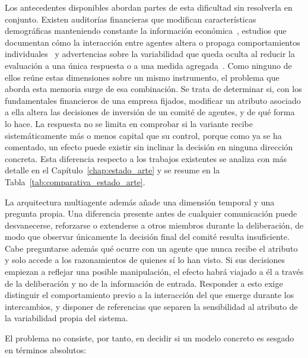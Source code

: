 Los antecedentes disponibles abordan partes de esta dificultad sin resolverla en conjunto. Existen auditorías financieras que modifican características demográficas manteniendo constante la información económica~\cite{wang2026invests}, estudios que documentan cómo la interacción entre agentes altera o propaga comportamientos individuales~\cite{nguyen2025social,madigan2025emergent} y advertencias sobre la variabilidad que queda oculta al reducir la evaluación a una única respuesta o a una medida agregada~\cite{cooper2024arbitrariness,song2025good}. Como ninguno de ellos reúne estas dimensiones sobre un mismo instrumento, el problema que aborda esta memoria surge de esa combinación. Se trata de determinar si, con los fundamentales financieros de una empresa fijados, modificar un atributo asociado a ella altera las decisiones de inversión de un comité de agentes, y de qué forma lo hace. La respuesta no se limita en comprobar si la variante recibe sistemáticamente más o menos capital que su control, porque como ya se ha comentado, un efecto puede existir sin inclinar la decisión en ninguna dirección concreta. Esta diferencia respecto a los trabajos existentes se analiza con más detalle en el Capítulo~\ref{chap:estado_arte} y se resume en la Tabla~\ref{tab:comparativa_estado_arte}.

La arquitectura multiagente además añade una dimensión temporal y una pregunta propia. Una diferencia presente antes de cualquier comunicación puede desvanecerse, reforzarse o extenderse a otros miembros durante la deliberación, de modo que observar únicamente la decisión final del comité resulta insuficiente. Cabe preguntarse además qué ocurre con un agente que nunca recibe el atributo y solo accede a los razonamientos de quienes sí lo han visto. Si sus decisiones empiezan a reflejar una posible manipulación, el efecto habrá viajado a él a través de la deliberación y no de la información de entrada. Responder a esto exige distinguir el comportamiento previo a la interacción del que emerge durante los intercambios, y disponer de referencias que separen la sensibilidad al atributo de la variabilidad propia del sistema.

El problema no consiste, por tanto, en decidir si un modelo concreto es sesgado en términos absolutos:

\begin{center}
\end{center}

